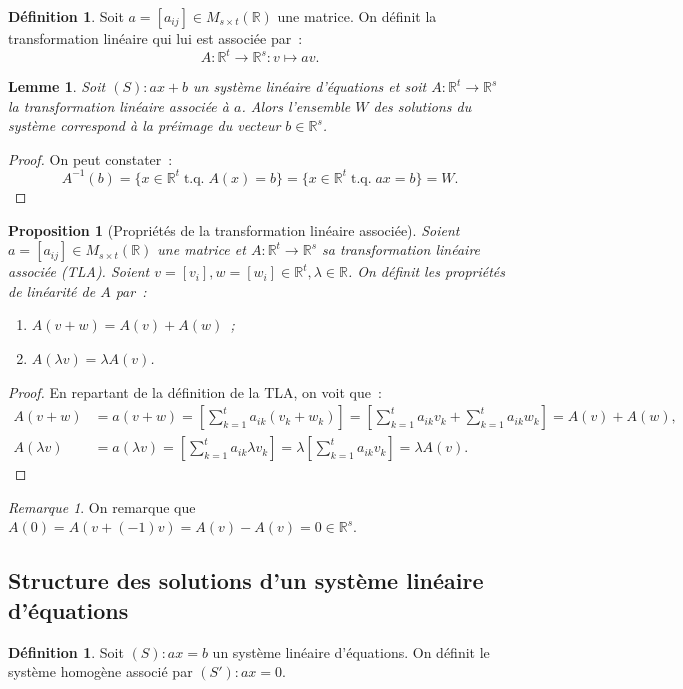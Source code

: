 \documentclass{article}
\DeclareMathOperator{\tq}{\text{ t.q. }}
\newcommand{\R}{\mathbb R}
\newcommand{\M}[3]{M_{#1 \times #2}(#3)}
\newtheorem{prp}[thm]{Proposition}
\newtheorem{lem}[thm]{Lemme}
\theoremstyle{definition}
\newtheorem{déf}[thm]{Définition}
\theoremstyle{remark}
\newtheorem*{rmq}{Remarque}
\begin{document}
		\begin{déf} Soit $a = [a_{ij}] \in \M st\R$ une matrice. On définit la transformation linéaire qui lui est associée par~:
		\[A : \R^t \to \R^s : v \mapsto av.\] \end{déf}

		\begin{lem} Soit $(S) : ax + b$ un système linéaire d'équations et soit $A : \R^t \to \R^s$ la transformation linéaire associée à $a$. Alors l'ensemble $W$ des
		solutions du système correspond à la préimage du vecteur $b \in \R^s$. \end{lem}

		\begin{proof} On peut constater~: \[A^{-1}(b) = \{x \in \R^t \tq A(x) = b\} = \{x \in \R^t \tq ax = b\} = W.\] \end{proof}

		\begin{prp}[Propriétés de la transformation linéaire associée] Soient $a = [a_{ij}] \in \M st\R$ une matrice et $A : \R^t \to \R^s$ sa transformation
		linéaire associée (TLA). Soient $v = [v_i], w = [w_i] \in \R^t, \lambda \in \R$. On définit les propriétés de linéarité de $A$ par~:
		\begin{enumerate}
			\item $A(v+w) = A(v) + A(w)$~;
			\item $A(\lambda v) = \lambda A(v)$.
		\end{enumerate}
		\end{prp}

		\begin{proof} En repartant de la définition de la TLA, on voit que~:
		\begin{align*}
			A(v+w) &= a(v+w) = \left[\sum_{k=1}^ta_{ik}(v_k+w_k)\right] = \left[\sum_{k=1}^ta_{ik}v_k+\sum_{k=1}^ta_{ik}w_k\right] = A(v) + A(w), \\
			A(\lambda v) &= a(\lambda v) = \left[\sum_{k=1}^ta_{ik}\lambda v_k\right] = \lambda \left[\sum_{k=1}^ta_{ik}v_k\right] = \lambda A(v).
		\end{align*}
		\end{proof}

		\begin{rmq} On remarque que $A(0) = A(v + (-1)v) = A(v) - A(v) = 0 \in \R^s$. \end{rmq}

	\subsection{Structure des solutions d'un système linéaire d'équations}
		\begin{déf} Soit $(S) : ax = b$ un système linéaire d'équations. On définit le système homogène associé par $(S') : ax = 0$. \end{déf}
\end{document}
